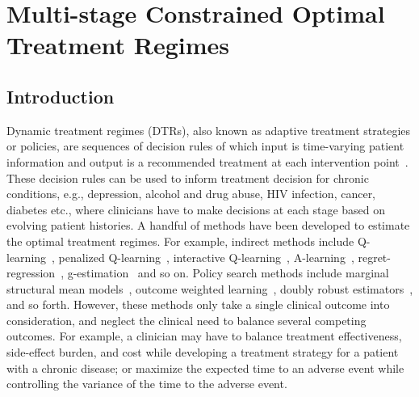 \chapter{Multi-stage Constrained Optimal Treatment Regimes}
\label{chap-two}

\section{Introduction}
Dynamic treatment regimes (DTRs), also known as adaptive treatment strategies or policies, are sequences of decision rules of which input is time-varying patient information and output is a recommended treatment at each intervention point~\cite{Chakraborty2014, Moodie2004, Murphy2003}. These decision rules can be used to inform treatment decision for chronic conditions, e.g., depression, alcohol and drug abuse, HIV infection, cancer, diabetes etc., where clinicians have to make decisions at each stage based on evolving patient histories. A handful of methods have been developed to estimate the optimal treatment regimes. For example, indirect methods include Q-learning~\cite{Nahum2012}, penalized Q-learning~\cite{Song2011}, interactive Q-learning~\cite{Linn2014}, A-learning~\cite{Schulte2014}, regret-regression~\cite{henderson2010}, g-estimation~\cite{gestimation} and so on. Policy search methods include marginal structural mean models~\cite{Robins2000,Orellana2010a}, outcome weighted learning~\cite{Zhao2012,Zhang2012,Zhao2015}, doubly robust estimators~\cite{Zhang2012b}, and so forth. However, these methods only take a single clinical outcome into consideration, and neglect the clinical need to balance several competing outcomes. For example, a clinician may have to balance treatment effectiveness, side-effect burden, and cost while developing a treatment strategy for a patient with a chronic disease; or maximize the expected time to an adverse event while controlling the variance of the time to the adverse event.\\

